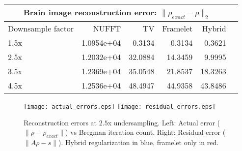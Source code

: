 \documentclass[11pt]{amsart}
\theoremstyle{remark}
\begin{document}
\begin{center}
\begin{tabular}{| p{2cm} || r | r | r | r | r | }
  \hline
  \multicolumn{5}{|c|}{Brain image reconstruction error: $\| \rho_{exact} - \rho \|_2$}\\
  \hline                       
  Downsample factor & NUFFT & TV & Framelet & Hybrid \\ \hline
  1.5x & 1.0954e+04 & 0.3134 & 0.3134 & 0.3621 \\
  2.5x & 1.2032e+04 & 32.0884 & 14.3459 & 9.9995 \\
  3.5x & 1.2369e+04 & 35.0548 & 21.8537 & 18.3263 \\
  4.5x & 1.2536e+04 & 48.4947 & 44.9358 & 43.8486 \\
  \hline  
\end{tabular}
\end{center}

\begin{center}
\begin{figure}[h!]
\texttt{[image: actual\_errors.eps]}
\texttt{[image: residual\_errors.eps]}
\caption{Reconstruction errors at $2.5$x undersampling. Left: Actual error ($\| \rho -\rho_{exact} \|$) vs Bregman iteration count. Right: Residual error ($\| A\rho - s \|$). Hybrid regularization in blue, framelet only in red.}
\end{figure}
\end{center}







\end{document}
